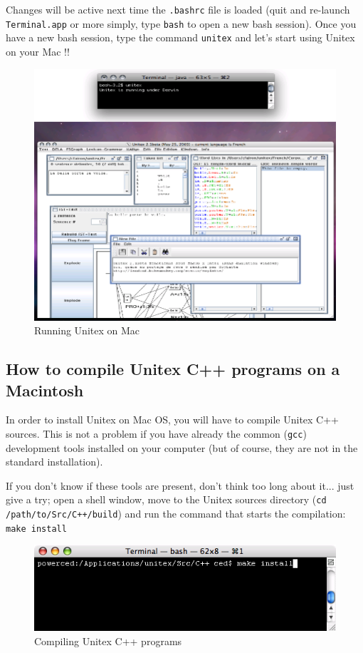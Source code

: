 \noindent Changes will be active next time the \verb+.bashrc+ file is loaded
(quit and re-launch \verb+Terminal.app+ or more simply, type \verb+bash+ to open
a new bash session). Once you have a new bash session, type the command 
\verb+unitex+ and let's start using Unitex on your Mac !!

\begin{figure}[!h]
\begin{center}
\includegraphics[width=13cm]{resources/img/fig-mac2.png}
\caption{Running Unitex on Mac\label{fig-mac2}}
\end{center}
\end{figure}

\subsection{How to compile Unitex C++ programs on a Macintosh}
\label{section-mac-compilation}
\noindent In order to install Unitex on Mac OS, you will have to compile
Unitex C++ sources. This is not a problem if you have already the common 
(\verb+gcc+) development tools installed on your computer (but of course, they
are not in the standard installation).

\bigskip
\noindent If you don't know if these tools are present, don't think too long
about it... just give a try; open a shell window, move to the Unitex sources
directory (\verb$cd /path/to/Src/C++/build$) and run the command that starts the
compilation: \verb+make install+

\begin{figure}[!h]
\begin{center}
\includegraphics[width=12cm]{resources/img/fig-mac3.png}
\caption{Compiling Unitex C++ programs\label{fig-mac3}}
\end{center}
\end{figure}


